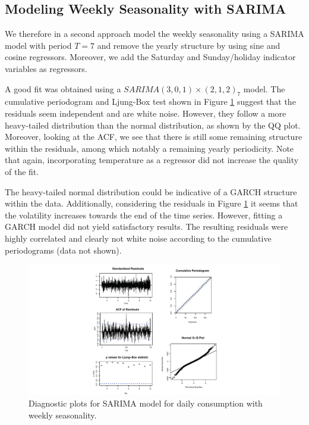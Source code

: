\documentclass[conference]{IEEEtran}
\begin{document}
\subsection{Modeling Weekly Seasonality with SARIMA}
We therefore in a second approach model the weekly seasonality using a SARIMA model with period $T=7$ and remove the yearly structure by using sine and cosine regressors. Moreover, we add the Saturday and Sunday/holiday indicator variables as regressors. 
\par
A good fit was obtained using a $SARIMA(3, 0, 1)\times(2, 1, 2)_{7}$ model. The cumulative periodogram and Ljung-Box test shown in Figure \ref{daily_sarima} suggest that the residuals seem independent and are white noise. However, they follow a more heavy-tailed distribution than the normal distribution, as shown by the QQ plot. Moreover, looking at the ACF, we see that there is still some remaining structure within the residuals, among which notably a remaining yearly periodicity. Note that again, incorporating temperature as a regressor did not increase the quality of the fit.

\par
The heavy-tailed normal distribution could be indicative of a GARCH structure within the data. Additionally, considering the residuals in Figure \ref{daily_sarima} it seems that the volatility increases towards the end of the time series. However, fitting a GARCH model did not yield satisfactory results. The resulting residuals were highly correlated and clearly not white noise according to the cumulative periodograms (data not shown).

\begin{figure}[ht]
	\centering
	\includegraphics[width=1\textwidth]{Figs/Fig6.pdf}
	\caption{Diagnostic plots for SARIMA model for daily consumption with weekly seasonality.}
	\label{daily_sarima}
\end{figure}
\end{document}
